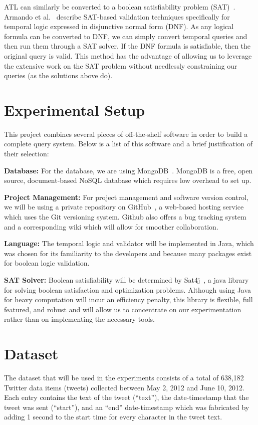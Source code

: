 \documentclass{acm_proc_article-sp}
\begin{document}
ATL can similarly be converted to a boolean satisfiability problem (SAT)~\cite{Cook:1971}. Armando et al.~\cite{Armando:1999} describe SAT-based validation techniques specifically for temporal logic expressed in disjunctive normal form (DNF).  As any logical formula can be converted to DNF, we can simply convert temporal queries and then run them through a SAT solver.  If the DNF formula is satisfiable, then the original query is valid.   This method has the advantage of allowing us to leverage the extensive work on the SAT problem without needlessly constraining our queries (as the solutions above do). 


\section{Experimental Setup}
This project combines several pieces of off-the-shelf software in order to build a complete query system.  Below is a list of this software and a brief justification of their selection:

\textbf{Database:} For the database, we are using MongoDB~\cite{10gen:2013}. MongoDB is a free, open source, document-based NoSQL database which requires low overhead to set up. 

\textbf{Project Management:} For project management and software version control, we will be using a private repository on GitHub~\cite{GitHub:2013}, a web-based hosting service which uses the Git versioning system. Github also offers a bug tracking system and a corresponding wiki which will allow for smoother collaboration. 

\textbf{Language:} The temporal logic and validator will be implemented in Java, which was chosen for its familiarity to the developers and because many packages exist for boolean logic validation. 

\textbf{SAT Solver:}  Boolean satisfiability will be determined by Sat4j~\cite{Een:2003}, a java library for solving boolean satisfaction and optimization problems.  Although using Java for heavy computation will incur an efficiency penalty, this library is flexible, full featured, and robust and will allow us to concentrate on our experimentation rather than on implementing the necessary tools.  

\section{Dataset}
The dataset that will be used in the experiments consists of a total of 638,182 Twitter data items (tweets) collected between May 2, 2012 and June 10, 2012. Each entry contains the text of the tweet (``text''), the date-timestamp that the tweet was sent (``start''), and an ``end'' date-timestamp which was fabricated by adding 1 second to the start time for every character in the tweet text.
\end{document}
